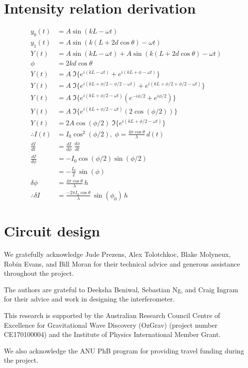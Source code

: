 \documentclass[prb,preprint]{revtex4-1}
\begin{document}
\section{Intensity relation derivation}
\begin{align}
    y_0(t) &= A \sin{(k L - \omega t)} \\
    y_1(t) &= A \sin{(k (L + 2 d \cos{\theta}) - \omega t)} \\
    Y(t) &= A \sin{(k L - \omega t)} + A \sin{(k (L + 2 d \cos{\theta}) - \omega t)} \\
    \phi &= 2 k d \cos{\theta} \\
    Y(t) &= A\; \Im\{e^{i (k L - \omega t)} + e^{i (k L + \phi - \omega t)}\} \\
    Y(t) &= A\; \Im\{e^{i (k L + \phi/2 - \phi/2 - \omega t)} + e^{i (k L + \phi/2 + \phi/2 - \omega t)}\} \\    
    Y(t) &= A\; \Im\{e^{i (k L + \phi/2 - \omega t)} (e^{- i \phi/2} + e^{i \phi/2})\} \\    
    Y(t) &= A\; \Im\{e^{i (k L + \phi/2 - \omega t)} (2 \cos{(\phi/2)})\} \\ 
    Y(t) &= 2 A \cos{(\phi/2)}\; \Im\{e^{i (k L + \phi/2 - \omega t)}\} \\  
    \therefore I(t) &= I_0 \cos^2{(\phi/2)}, \; \phi = \frac{4 \pi \cos{\theta}}{\lambda}\, d(t) \\
    \frac{dI}{dt} &= \frac{dI}{d\phi}\; \frac{d\phi}{dt}\\
    \frac{dI}{d\phi} &= - I_0 \cos{(\phi/2)} \sin{(\phi/2)}\\
    &= - \frac{I_0}{2}\, \sin{(\phi)}\\
    \delta\phi &= \frac{4 \pi \cos{\theta}}{\lambda}\, h\\
    \therefore \delta I &= \frac{- 2 \pi I_0 \cos{\theta}}{\lambda}\,\sin{(\phi_0)}\, h
\end{align}

\section{Circuit design}

\begin{acknowledgments}
We gratefully acknowledge Jude Prezens, Alex Tolotchkoc, Blake Molyneux, Robin Evans, and Bill Moran for their technical advice and generous assistance throughout the project.

The authors are grateful to Deeksha Beniwal, Sebastian Ng, and Craig Ingram for their advice and work in designing the interferometer. 

This research is supported by the Australian Research Council Centre of Excellence for Gravitational Wave Discovery (OzGrav) (project number CE170100004) and the Institute of Physics International Member Grant.

We also acknowledge the ANU PhB program for providing travel funding during the project.


\end{acknowledgments}




\end{document}

